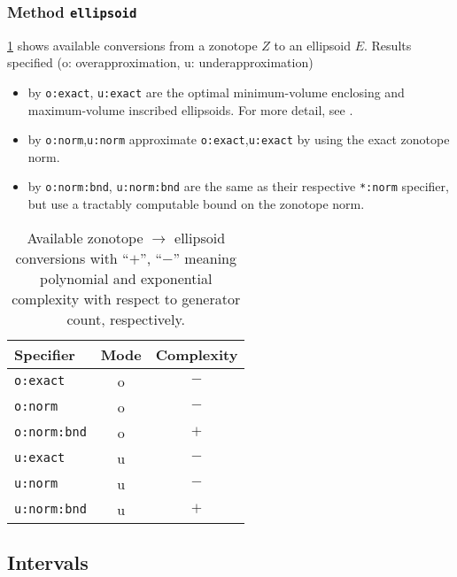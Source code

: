 \subsubsection{Method \texttt{ellipsoid}} \label{sec:zono_ellipsoid}
\cref{tab:zono_ell} shows available conversions from a zonotope $Z$ to an ellipsoid $E$. Results specified (o: overapproximation, u: underapproximation)
\begin{itemize}
    \item by \texttt{o:exact}, \texttt{u:exact} are the optimal minimum-volume enclosing and maximum-volume inscribed ellipsoids. For more detail, see \cite[Sec. 8.4.1, Sec. 8.4.2]{Boyd2004}.
    \item by \texttt{o:norm},\texttt{u:norm} approximate \texttt{o:exact},\texttt{u:exact} by using the exact zonotope norm.
    \item by \texttt{o:norm:bnd}, \texttt{u:norm:bnd} are the same as their respective \texttt{*:norm} specifier, but use a tractably computable bound on the zonotope norm.
\end{itemize}

\begin{table}[h]
    \caption{Available zonotope $\rightarrow$ ellipsoid conversions with ``$+$'', ``$-$'' meaning polynomial and exponential complexity with respect to generator count, respectively.}
    \centering
    \label{tab:zono_ell}
    \begin{tabular}{lcc}
        \toprule
        \textbf{Specifier}  & \textbf{Mode} & \textbf{Complexity} \\
        \midrule
        \texttt{o:exact}    & o             & $-$                 \\
        \texttt{o:norm}     & o             & $-$                 \\
        \texttt{o:norm:bnd} & o             & $+$                 \\
        \texttt{u:exact}    & u             & $-$                 \\
        \texttt{u:norm}     & u             & $-$                 \\
        \texttt{u:norm:bnd} & u             & $+$                 \\
        \bottomrule
    \end{tabular}
\end{table}



\subsection{Intervals}    \label{sec:intervalOperations}

